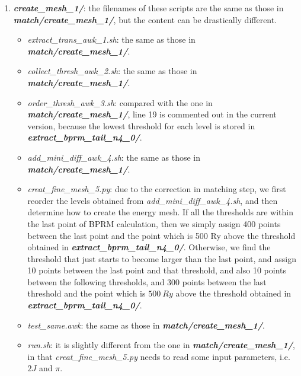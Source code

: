 \begin{enumerate}
\begin{enumerate}
			\item \textbf{\textit{create\_mesh\_1/}}: the filenames of these scripts are the same as those in 
			\textbf{\textit{match/create\_mesh\_1/}}, but the content can be drastically different.
				\begin{itemize}
					\item \textit{extract\_trans\_awk\_1.sh}: the same as those in \textbf{\textit{match/create\_mesh\_1/}}.
					\item \textit{collect\_thresh\_awk\_2.sh}: the same as those in \textbf{\textit{match/create\_mesh\_1/}}.					
					\item \textit{order\_thresh\_awk\_3.sh}: compared with the one in \textbf{\textit{match/create\_mesh\_1/}}, line 19 is commented out in the current version, because the lowest threshold for each level is stored in \textbf{\textit{extract\_bprm\_tail\_n4\_0/}}.					
					\item \textit{add\_mini\_diff\_awk\_4.sh}: the same as those in \textbf{\textit{match/create\_mesh\_1/}}.			
					\item \textit{creat\_fine\_mesh\_5.py}: due to the correction in matching step, we first reorder the levels obtained from \textit{add\_mini\_diff\_awk\_4.sh}, and then determine how to create the energy mesh. If all the thresholds are within the last point of BPRM calculation, then we simply assign 400 points between the last point and the point which is 500 Ry above the threshold obtained in \textbf{\textit{extract\_bprm\_tail\_n4\_0/}}. Otherwise, we find the threshold that just starts to become larger than the last point, and assign 10 points between the last point and that threshold, and also 10 points between the following thresholds, and 300 points between the last threshold and the point which is $500~Ry$ above the threshold obtained in \textbf{\textit{extract\_bprm\_tail\_n4\_0/}}.					
					\item \textit{test\_same.awk}: the same as those in \textbf{\textit{match/create\_mesh\_1/}}.					
					\item \textit{run.sh}: it is slightly different from the one in \textbf{\textit{match/create\_mesh\_1/}}, in that \textit{creat\_fine\_mesh\_5.py} needs to read some input parameters, i.e. $2J$ and $\pi$.					
				\end{itemize}
			

\end{enumerate}
\end{enumerate}

